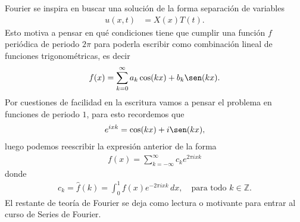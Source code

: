   Fourier se inspira en buscar una solución de la forma separación de variables
  \begin{align*}
    u(x,t)&=X(x)T(t).
  \end{align*}
  Esto motiva a pensar en qué condiciones tiene que cumplir una función $f$ periódica de periodo $2\pi$ para poderla escribir como combinación lineal de funciones trigonométricas, es decir
  \begin{align*}
    f(x)=\sum_{k=0}^{\infty}a_{k}\cos(kx)+b_k\sen(kx).
  \end{align*}
  Por cuestiones de facilidad en la escritura vamos a pensar el problema en funciones de periodo $1$, para esto recordemos que
  \begin{align*}
    e^{ixk}=\cos(kx)+i\sen(kx),
  \end{align*}
  luego podemos reescribir la expresión anterior de la forma
  \begin{align*}
    f(x)=\sum_{k=-\infty}^{\infty}c_{k}e^{2\pi ixk}
  \end{align*}
  donde
  \begin{align*}
    c_{k}=\hat{f}(k)=\int_{0}^{1}f(x)e^{-2\pi i xk}\,dx,\quad\text{para todo $k\in\mathbb{Z}$.}
  \end{align*}
  El restante de teoría de Fourier se deja como lectura o motivante para entrar al curso de Series de Fourier.
